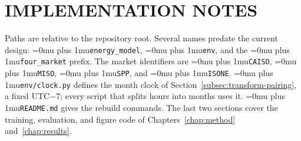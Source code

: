 \documentclass{UNCC-thesis}
\newcommand{\codepath}[1]{{\Urlmuskip=0mu plus 1mu\relax\nolinkurl{#1}}}
\begin{document}
\chapter{IMPLEMENTATION NOTES}
\label{app:implementation}
\raggedright
\setlength{\parindent}{.17in}

Paths are relative to the repository root. Several names predate the current
design: \codepath{energy_model}, \codepath{env},
and the \codepath{four_market} prefix. The market identifiers are
\codepath{CAISO}, \codepath{MISO}, \codepath{SPP}, and \codepath{ISONE}.
\codepath{env/clock.py} defines the month clock of
Section~\ref{subsec:transform-pairing}, a fixed UTC\(-7\); every script that
splits hours into months uses it. \codepath{README.md} gives the rebuild
commands. The last two sections cover the training, evaluation, and figure code of
Chapters~\ref{chap:method} and~\ref{chap:results}.
\end{document}
